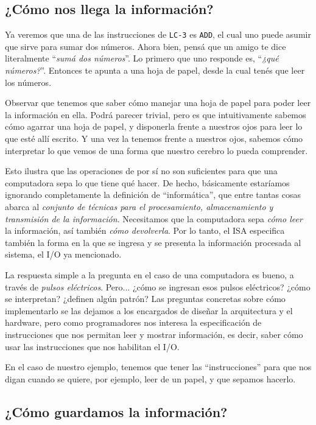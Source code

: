 \documentclass[a4paper, titlepage]{report}
\begin{document}
	\subsection{¿Cómo nos llega la información?}
	
	Ya veremos que una de las instrucciones de \texttt{LC-3} es \texttt{ADD}, el cual uno puede asumir que sirve para sumar dos números. Ahora bien, pensá que un amigo te dice literalmente ``\textit{sumá dos números}''. Lo primero que uno responde es, ``\textit{¿qué números?}''. Entonces te apunta a una hoja de papel, desde la cual tenés que leer los números.
	
	Observar que tenemos que saber cómo manejar una hoja de papel para poder leer la información en ella. Podrá parecer trivial, pero es que intuitivamente sabemos cómo agarrar una hoja de papel, y disponerla frente a nuestros ojos para leer lo que esté allí escrito. Y una vez la tenemos frente a nuestros ojos, sabemos cómo interpretar lo que vemos de una forma que nuestro cerebro lo pueda comprender.
	
	Esto ilustra que las operaciones de por sí no son suficientes para que una computadora sepa lo que tiene qué hacer. De hecho, básicamente estaríamos ignorando completamente la definición de ``informática'', que entre tantas cosas abarca al \textit{conjunto de técnicas para el procesamiento, almacenamiento y transmisión de la información}. Necesitamos que la computadora sepa \textit{cómo leer} la información, así también \textit{cómo devolverla}. Por lo tanto, el ISA especifica también la forma en la que se ingresa y se presenta la información procesada al sistema, el I/O ya mencionado.
	
	La respuesta simple a la pregunta en el caso de una computadora es bueno, a través de \textit{pulsos eléctricos}. Pero... ¿cómo se ingresan esos pulsos eléctricos? ¿cómo se interpretan? ¿definen algún patrón? Las preguntas concretas sobre cómo implementarlo se las dejamos a los encargados de diseñar la arquitectura y el hardware, pero como programadores nos interesa la especificación de instrucciones que nos permitan leer y mostrar información, es decir, saber cómo usar las instrucciones que nos habilitan el I/O.
	
	En el caso de nuestro ejemplo, tenemos que tener las ``instrucciones'' para que nos digan cuando se quiere, por ejemplo, leer de un papel, y que sepamos hacerlo.
	
	\subsection{¿Cómo guardamos la información?}
	
\end{document}
